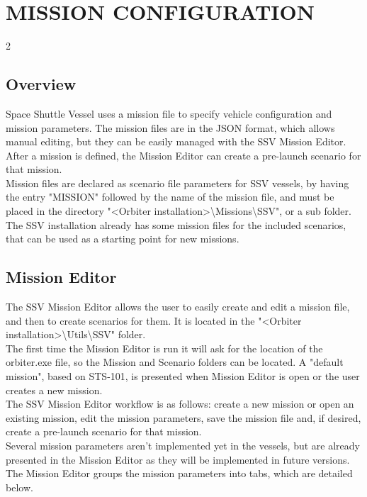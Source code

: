 \documentclass[Space_Shuttle_Vessel_Manual.tex]{subfiles}
\begin{document}
\section{MISSION CONFIGURATION}
\begin{multicols*}{2}
\label{sec:mission-configuration}
\renewcommand{\cfttoctitlefont}{\bf}
\localtableofcontents
\newpage


\subsection{Overview}
\noindent
Space Shuttle Vessel uses a mission file to specify vehicle configuration and mission parameters. The mission files are in the JSON format, which allows manual editing, but they can be easily managed with the SSV Mission Editor. After a mission is defined, the Mission Editor can create a pre-launch scenario for that mission.\\
Mission files are declared as scenario file parameters for SSV vessels, by having the entry "MISSION" followed by the name of the mission file, and must be placed in the directory "<Orbiter installation>\textbackslash Missions\textbackslash SSV", or a sub folder.\\
The SSV installation already has some mission files for the included scenarios, that can be used as a starting point for new missions.
\newpage


\subsection{Mission Editor}
\noindent
The SSV Mission Editor allows the user to easily create and edit a mission file, and then to create scenarios for them. It is located in the "<Orbiter installation>\textbackslash Utils\textbackslash SSV" folder.\\
The first time the Mission Editor is run it will ask for the location of the orbiter.exe file, so the Mission and Scenario folders can be located. A "default mission", based on STS-101, is presented when Mission Editor is open or the user creates a new mission.\\
The SSV Mission Editor workflow is as follows: create a new mission or open an existing mission, edit the mission parameters, save the mission file and, if desired, create a pre-launch scenario for that mission.\\
Several mission parameters aren't implemented yet in the vessels, but are already presented in the Mission Editor as they will be implemented in future versions.\\
The Mission Editor groups the mission parameters into tabs, which are detailed below.



\end{multicols*}
\end{document}
